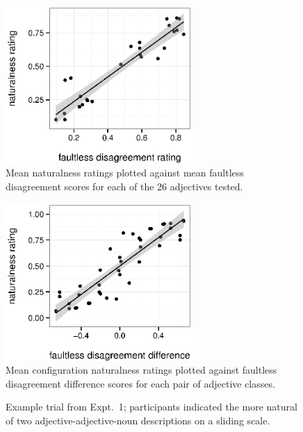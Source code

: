 \documentclass{pnastwo}
\begin{document}
\begin{figure}
	\centering\includegraphics[width=2.8in]{plots/naturalness-faultless-new.eps}
	\caption{Mean naturalness ratings plotted against mean faultless disagreement scores for each of the 26 adjectives tested.}\label{naturalness-faultless-pred}
\end{figure}

\begin{figure}
	\centering\includegraphics[width=2.8in]{plots/naturalness-faultless-configuration.eps}
	\caption{Mean configuration naturalness ratings plotted against faultless disagreement difference scores for each pair of adjective classes.}\label{naturalness-faultless}
\end{figure}


\begin{figure}[h]
	\centering
	\caption{Example trial from Expt.\ 1; participants indicated the more natural of two adjective-adjective-noun descriptions on a sliding scale.}\label{order-trial}
\end{figure}
\end{document}
